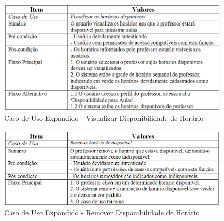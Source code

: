 \documentclass{abnt}
\begin{document}
		\begin{figure}[h]
							\begin{center}
								 \includegraphics[width=450px]{casoUsoVisualizarHorarioDisponivelAula}
								 \caption{Caso de Uso Expandido - Visualizar Disponibilidade de Horário}
							\end{center}
				\end{figure}
				
		\begin{figure}[h]
									\begin{center}
										 \includegraphics[width=450px]{casoUsoRemoverHorarioDisponivelAula}
									 \caption{Caso de Uso Expandido - Remover Disponibilidade de Horário}
								\end{center}
					\end{figure}
		
\end{document}
